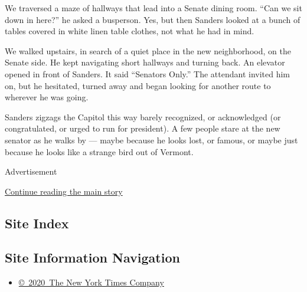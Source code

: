We traversed a maze of hallways that lead into a Senate dining room.
``Can we sit down in here?'' he asked a busperson. Yes, but then Sanders
looked at a bunch of tables covered in white linen table clothes, not
what he had in mind.

We walked upstairs, in search of a quiet place in the new neighborhood,
on the Senate side. He kept navigating short hallways and turning back.
An elevator opened in front of Sanders. It said ``Senators Only.'' The
attendant invited him on, but he hesitated, turned away and began
looking for another route to wherever he was going.

Sanders zigzags the Capitol this way barely recognized, or acknowledged
(or congratulated, or urged to run for president). A few people stare at
the new senator as he walks by --- maybe because he looks lost, or
famous, or maybe just because he looks like a strange bird out of
Vermont.

Advertisement

\protect\hyperlink{after-bottom}{Continue reading the main story}

\hypertarget{site-index}{%
\subsection{Site Index}\label{site-index}}

\hypertarget{site-information-navigation}{%
\subsection{Site Information
Navigation}\label{site-information-navigation}}

\begin{itemize}
\tightlist
\item
  \href{https://help.nytimes3xbfgragh.onion/hc/en-us/articles/115014792127-Copyright-notice}{©~2020~The
  New York Times Company}
\end{itemize}

